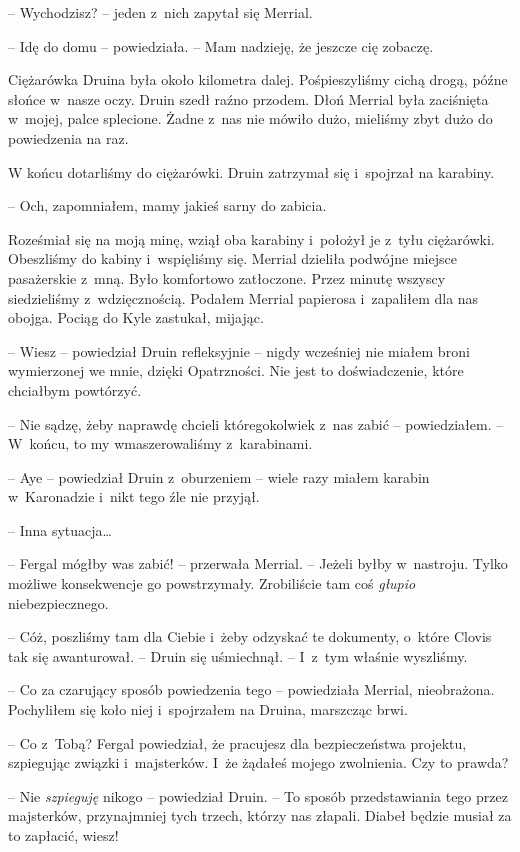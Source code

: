 \documentclass[oneside,polish,11pt,sfheadings]{mwbk}
\begin{document}
-- Wychodzisz? -- jeden z~nich zapytał się Merrial.

-- Idę do domu -- powiedziała. -- Mam nadzieję, że jeszcze cię zobaczę.

Ciężarówka Druina była około kilometra dalej. Pośpieszyliśmy cichą
drogą, późne słońce w~nasze oczy. Druin szedł raźno przodem. Dłoń
Merrial była zaciśnięta w~mojej, palce splecione. Żadne z~nas nie mówiło
dużo, mieliśmy zbyt dużo do powiedzenia na raz.

W końcu dotarliśmy do ciężarówki. Druin zatrzymał się i~spojrzał na
karabiny.

-- Och, zapomniałem, mamy jakieś sarny do zabicia.

Roześmiał się na moją minę, wziął oba karabiny i~położył je z~tyłu
ciężarówki. Obeszliśmy do kabiny i~wspięliśmy się. Merrial dzieliła
podwójne miejsce pasażerskie z~mną. Było komfortowo zatłoczone. Przez
minutę wszyscy siedzieliśmy z~wdzięcznością. Podałem Merrial papierosa i~zapaliłem dla nas obojga. Pociąg do Kyle zastukał, mijając.

-- Wiesz -- powiedział Druin refleksyjnie -- nigdy wcześniej nie miałem
broni wymierzonej we mnie, dzięki Opatrzności. Nie jest to
doświadczenie, które chciałbym powtórzyć.

-- Nie sądzę, żeby naprawdę chcieli któregokolwiek z~nas zabić -- powiedziałem. -- W~końcu, to my wmaszerowaliśmy z~karabinami.

-- Aye -- powiedział Druin z~oburzeniem -- wiele razy miałem karabin w~Karonadzie i~nikt tego źle nie przyjął.

-- Inna sytuacja\ldots

-- Fergal mógłby was zabić! -- przerwała Merrial. -- Jeżeli byłby w~nastroju. Tylko możliwe konsekwencje go powstrzymały. Zrobiliście tam
coś \textit{głupio} niebezpiecznego.

-- Cóż, poszliśmy tam dla Ciebie i~żeby odzyskać te dokumenty, o~które
Clovis tak się awanturował. -- Druin się uśmiechnął. -- I~z~tym właśnie
wyszliśmy.

-- Co za czarujący sposób powiedzenia tego -- powiedziała Merrial,
nieobrażona. Pochyliłem się koło niej i~spojrzałem na Druina, marszcząc
brwi.

-- Co z~Tobą? Fergal powiedział, że pracujesz dla bezpieczeństwa
projektu, szpiegując związki i~majsterków. I~że żądałeś mojego
zwolnienia. Czy to prawda?

-- Nie \textit{szpieguję} nikogo -- powiedział Druin. -- To sposób
przedstawiania tego przez majsterków, przynajmniej tych trzech, którzy
nas złapali. Diabeł będzie musiał za to zapłacić, wiesz!
\end{document}
